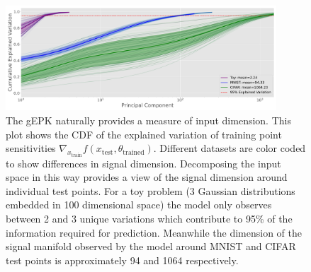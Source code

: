 \begin{figure}[t]
    \centering
    \includegraphics[width=0.9\textwidth]{c4a_figures/dimensionality_chords.pdf}
    \caption{The gEPK naturally provides a measure of input dimension. This plot shows the CDF of the explained variation of training point sensitivities $\nabla_{x_\text{train}}f(x_\text{test}, \theta_\text{trained})$. Different datasets are color coded to show differences in signal dimension. Decomposing the input space in this way provides a view of the signal dimension around individual test points. For a toy problem (3 Gaussian distributions embedded in 100 dimensional space) the model only observes between 2 and 3 unique variations which contribute to 95\% of the information required for prediction. Meanwhile the dimension of the signal manifold observed by the model around MNIST and CIFAR test points is approximately 94 and 1064 respectively. }
    \label{fig:cdf}
\end{figure}
 


